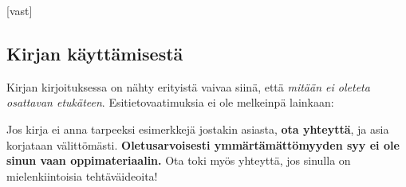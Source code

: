 \providecommand{\lukufilter}[2]{#2} %
\newcommand{\osa}[1]{\chapter{#1}} %
\newcommand{\nosa}[1]{\chapter*{#1} \addcontentsline{toc}{chapter}{#1}} %
\newcommand{\luku}[2]{\section{#2} \lukufilter{#1}{ }} %
\newcommand{\nluku}[2]{\section*{#2} \addcontentsline{toc}{section}{#2} \lukufilter{#1}{}} %
\newcommand{\vast}{\section*{Vastaukset} \addcontentsline{toc}{section}{Vastaukset} \begin{vastaussivu}  \end{vastaussivu}}

[vast] %

\newpage

\subsection*{Kirjan käyttämisestä}

Kirjan kirjoituksessa on nähty erityistä vaivaa siinä, että \textit{mitään ei oleteta osattavan etukäteen}. Esitietovaatimuksia ei ole melkeinpä lainkaan:


Jos kirja ei anna tarpeeksi esimerkkejä jostakin asiasta, \textbf{ota yhteyttä}, ja asia korjataan välittömästi. \textbf{Oletusarvoisesti ymmärtämättömyyden syy ei ole sinun vaan oppimateriaalin.} Ota toki myös yhteyttä, jos sinulla on mielenkiintoisia tehtäväideoita!

